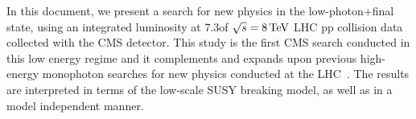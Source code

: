 In this document, we present a search for new physics in the low-\et photon+\met final state, using an integrated luminosity at 7.3\fbinv of $\sqrt{s}=8\,\text{Te\hspace{-.08em}V}$ LHC pp collision data collected with the CMS detector. This study is the first CMS search conducted in this low energy regime and it complements and expands upon previous high-energy monophoton searches for new physics conducted at the LHC~\cite{Chatrchyan:2012tea,Aad:2012fw}. The results are interpreted in terms of the low-scale SUSY breaking model, as well as in a model independent manner.





